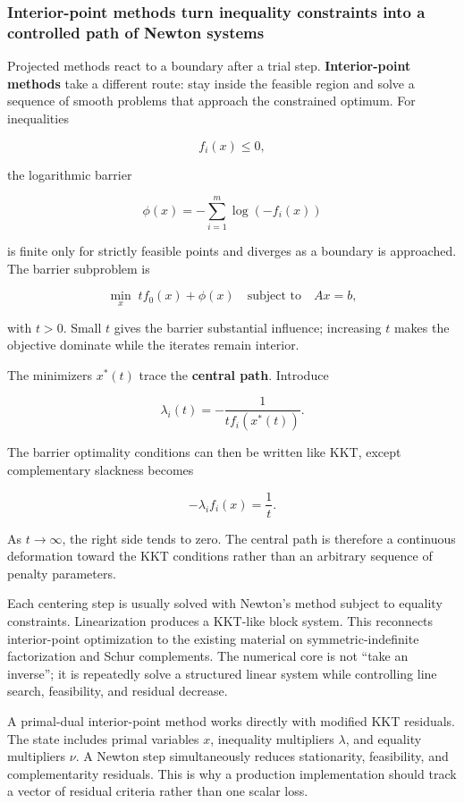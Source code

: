 \subsubsection{Interior-point methods turn inequality constraints into a controlled path of Newton systems}\label{interior-point-methods-turn-inequality-constraints-into-a-controlled-path-of-newton-systems}

Projected methods react to a boundary after a trial step. \textbf{Interior-point methods} take a different route: stay inside the feasible region and solve a sequence of smooth problems that approach the constrained optimum. For inequalities

\[
f_i(x)\le0,
\]

the logarithmic barrier

\[
\phi(x)
=
-\sum_{i=1}^{m}\log(-f_i(x))
\]

is finite only for strictly feasible points and diverges as a boundary is approached. The barrier subproblem is

\[
\min_x\;
t f_0(x)+\phi(x)
\quad
\text{subject to}\quad Ax=b,
\]

with \(t>0\). Small \(t\) gives the barrier substantial influence; increasing \(t\) makes the objective dominate while the iterates remain interior.

The minimizers \(x^*(t)\) trace the \textbf{central path}. Introduce

\[
\lambda_i(t)
=
-\frac{1}{t f_i(x^*(t))}.
\]

The barrier optimality conditions can then be written like KKT, except complementary slackness becomes

\[
-\lambda_i f_i(x)=\frac{1}{t}.
\]

As \(t\rightarrow\infty\), the right side tends to zero. The central path is therefore a continuous deformation toward the KKT conditions rather than an arbitrary sequence of penalty parameters.

Each centering step is usually solved with Newton's method subject to equality constraints. Linearization produces a KKT-like block system. This reconnects interior-point optimization to the existing material on symmetric-indefinite factorization and Schur complements. The numerical core is not ``take an inverse''; it is repeatedly solve a structured linear system while controlling line search, feasibility, and residual decrease.

A primal-dual interior-point method works directly with modified KKT residuals. The state includes primal variables \(x\), inequality multipliers \(\lambda\), and equality multipliers \(\nu\). A Newton step simultaneously reduces stationarity, feasibility, and complementarity residuals. This is why a production implementation should track a vector of residual criteria rather than one scalar loss.

